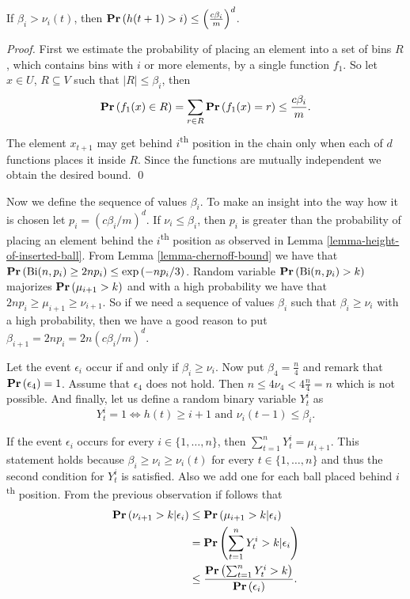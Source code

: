 \begin{lemma}
\label{lemma-height-of-inserted-ball}
If $\beta_i > \nu_i(t)$, then $\mathbf{Pr}\left(h(t + 1) > i\right) \leq \left(\frac{c\beta_i}{m}\right) ^ d$.
\end{lemma}
\begin{proof}
First we estimate the probability of placing an element into a set of bins $R$, which contains bins with $i$ or more elements, by a single function $f_1$. So let $x \in U$, $R \subseteq V$ such that $|R| \leq \beta_i$, then $$\mathbf{Pr}\left(f_1(x) \in R\right) = \displaystyle\sum_{r \in R} \mathbf{Pr}\left(f_1(x) = r\right) \leq \frac{c\beta_i}{m}.$$
The element $x_{t + 1}$ may get behind $i$\textsuperscript{th} position in the chain only when each of $d$ functions places it inside $R$. Since the functions are mutually independent we obtain the desired bound.
\qed
\end{proof}

Now we define the sequence of values $\beta_i$. To make an insight into the way how it is chosen let $p_i = \left({c\beta_i}/{m}\right) ^ d$. If $\nu_i \leq \beta_i$, then $p_i$ is greater than the probability of placing an element behind the $i$\textsuperscript{th} position as observed in Lemma \ref{lemma-height-of-inserted-ball}. From Lemma \ref{lemma-chernoff-bound} we have that $\mathbf{Pr}\left(\mathrm{Bi}(n, p_i) \geq 2np_i\right) \leq \exp\left({-np_i}/{3}\right)$. Random variable $\mathbf{Pr}\left(\mathrm{Bi}(n, p_i) > k\right)$ majorizes $\mathbf{Pr}\left(\mu_{i + 1} > k\right)$ and with a high probability we have that $2np_i \geq \mu_{i + 1} \geq \nu_{i + 1}$. So if we need a sequence of values $\beta_i$ such that $\beta_i \geq \nu_{i}$ with a high probability, then we have a good reason to put $\beta_{i + 1} = 2np_i = 2n\left({c\beta_i}/{m}\right) ^ d$.

Let the event $\epsilon_i$ occur if and only if $\beta_i \geq \nu_i$. Now put $\beta_4 = \frac{n}{4}$ and remark that $\mathbf{Pr}\left(\epsilon_4\right) = 1$. Assume that $\epsilon_4$ does not hold. Then $n \leq 4 \nu_4 < 4 \frac{n}{4} = n$ which is not possible. And finally, let us define a random binary variable $Y_t^i$ as $$Y_t^i = 1 \Leftrightarrow h(t) \geq i + 1 \mbox{ and } \nu_i(t - 1) \leq \beta_i \textit{.}$$

If the event $\epsilon_i$ occurs for every $i \in \{1, \dots, n\}$, then $\sum_{t = 1}^{n} Y_t^i = \mu_{i + 1}$. This statement holds because $\beta_i \geq \nu_i \geq \nu_i(t)$ for every $t \in \{1, \dots, n\}$ and thus the second condition for $Y_t^i$ is satisfied. Also we add one for each ball placed behind $i$\textsuperscript{th} position. 
From the previous observation if follows that
\[
\begin{split}
\mathbf{Pr}\left(\nu_{i + 1} > k | \epsilon_i\right) 
	& \leq \mathbf{Pr}\left(\mu_{i + 1} > k | \epsilon_i\right) \\
	& = \mathbf{Pr}\left(\displaystyle\sum_{t = 1}^{n} Y_t^{i} > k | \epsilon_i\right) \\
	& \leq \frac{\mathbf{Pr}\left(\sum_{t = 1}^{n} Y_t^{i} > k\right)}{\mathbf{Pr}\left(\epsilon_i\right)}. \\
\end{split}
\]

